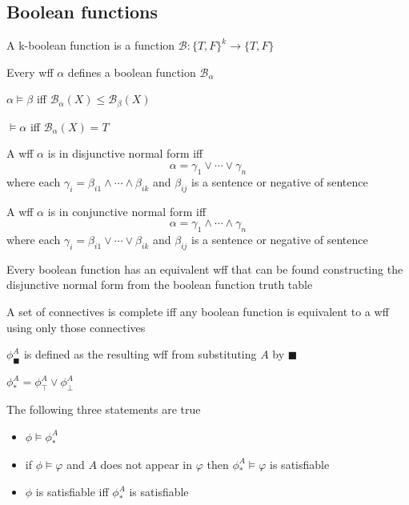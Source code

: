 \documentclass[../../main.tex]{subfiles}
\begin{document}
\subsection{Boolean functions}


\begin{definition}
    A k-boolean function is a function $\mathcal{B}:\{T,F\}^k\rightarrow\{T,F\}$
\end{definition}
\begin{theorem}
    Every wff $\alpha$ defines a boolean function $\mathcal{B}_\alpha$
\end{theorem}
\begin{theorem}
    $\alpha\models\beta$ iff $\mathcal{B}_\alpha(X)\le\mathcal{B}_\beta(X)$
\end{theorem}
\begin{theorem}
    $\models\alpha$ iff $\mathcal{B}_\alpha(X)=T$
\end{theorem}
\begin{definition}
    A wff $\alpha$ is in disjunctive normal form iff
    $$
    \alpha=\gamma_1\vee\cdots\vee\gamma_n
    $$
    where each $\gamma_i=\beta_{i1}\wedge\cdots\wedge\beta_{ik}$ and $\beta_{ij}$ is a sentence or negative of sentence
\end{definition}
\begin{definition}
    A wff $\alpha$ is in conjunctive normal form iff
    $$
    \alpha=\gamma_1\wedge\cdots\wedge\gamma_n
    $$
    where each $\gamma_i=\beta_{i1}\vee\cdots\vee\beta_{ik}$ and $\beta_{ij}$ is a sentence or negative of sentence
\end{definition}
\begin{theorem}
    Every boolean function has an equivalent wff that can be found constructing the disjunctive normal form from the boolean function truth table
\end{theorem}
\begin{definition}
    A set of connectives is complete iff any boolean function is equivalent to a wff using only those connectives
\end{definition}
\begin{definition}[Substitution]
    $\phi_\blacksquare^A$ is defined as the resulting wff from substituting $A$ by $\blacksquare$
\end{definition}
\begin{definition}[Resolution]
    $\phi_*^A = \phi_\top^A \vee \phi_\bot^A$
\end{definition}
\begin{theorem}
    The following three statements are true
    \begin{itemize}
        \item $\phi\models\phi_*^A$
        \item if $\phi\models\varphi$ and $A$ does not appear in $\varphi$ then $\phi_*^A\models\varphi$ is satisfiable
        \item $\phi$ is satisfiable iff $\phi_*^A$ is satisfiable
    \end{itemize}
\end{theorem}
\end{document}
